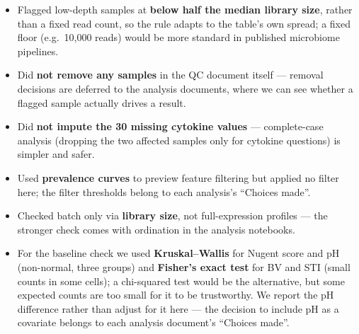 \documentclass[
  letterpaper,
  DIV=11,
  numbers=noendperiod]{scrartcl}
\providecommand{\tightlist}{%
  \setlength{\itemsep}{0pt}\setlength{\parskip}{0pt}}
\begin{document}
\begin{itemize}
\tightlist
\item
  Flagged low-depth samples at \textbf{below half the median library
  size}, rather than a fixed read count, so the rule adapts to the
  table's own spread; a fixed floor (e.g.~10,000 reads) would be more
  standard in published microbiome pipelines.
\item
  Did \textbf{not remove any samples} in the QC document itself ---
  removal decisions are deferred to the analysis documents, where we can
  see whether a flagged sample actually drives a result.
\item
  Did \textbf{not impute the 30 missing cytokine values} ---
  complete-case analysis (dropping the two affected samples only for
  cytokine questions) is simpler and safer.
\item
  Used \textbf{prevalence curves} to preview feature filtering but
  applied no filter here; the filter thresholds belong to each
  analysis's ``Choices made''.
\item
  Checked batch only via \textbf{library size}, not full-expression
  profiles --- the stronger check comes with ordination in the analysis
  notebooks.
\item
  For the baseline check we used \textbf{Kruskal--Wallis} for Nugent
  score and pH (non-normal, three groups) and \textbf{Fisher's exact
  test} for BV and STI (small counts in some cells); a chi-squared test
  would be the alternative, but some expected counts are too small for
  it to be trustworthy. We report the pH difference rather than adjust
  for it here --- the decision to include pH as a covariate belongs to
  each analysis document's ``Choices made''.
\end{itemize}
\end{document}
